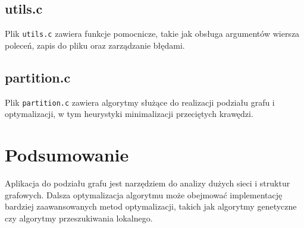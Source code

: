 \documentclass[a4paper,12pt]{article}
\begin{document}
\subsection{utils.c}
Plik \texttt{utils.c} zawiera funkcje pomocnicze, takie jak obsługa argumentów wiersza poleceń, zapis do pliku oraz zarządzanie błędami.

\subsection{partition.c}
Plik \texttt{partition.c} zawiera algorytmy służące do realizacji podziału grafu i optymalizacji, w tym heurystyki minimalizacji przeciętych krawędzi.

\section{Podsumowanie}
Aplikacja do podziału grafu jest narzędziem do analizy dużych sieci i struktur grafowych. Dalsza optymalizacja algorytmu może obejmować implementację bardziej zaawansowanych metod optymalizacji, takich jak algorytmy genetyczne czy algorytmy przeszukiwania lokalnego.
\end{document}
